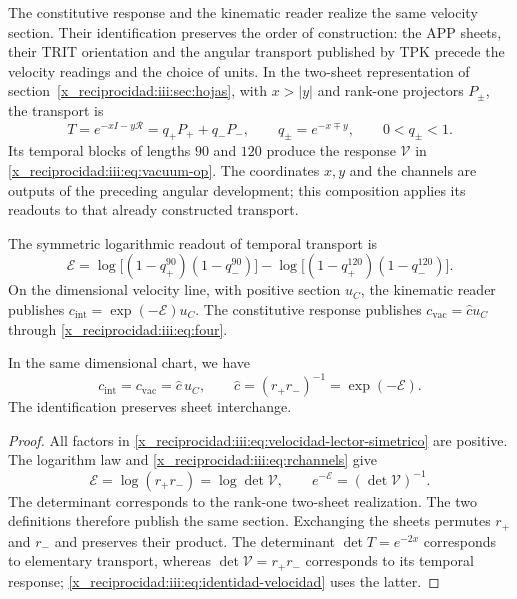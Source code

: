 The constitutive response and the kinematic reader realize the same
velocity section. Their identification preserves the order of construction:
the APP sheets, their TRIT orientation and the angular transport published
by TPK precede the velocity readings and the choice of units.
In the two-sheet representation of
section~\ref{x_reciprocidad:iii:sec:hojas}, with $x>|y|$ and rank-one projectors
$P_\pm$, the transport is
\[
 T=e^{-xI-y\mathcal R}=q_+P_++q_-P_-,
 \qquad q_\pm=e^{-x\mp y},\qquad 0<q_\pm<1.
\]
Its temporal blocks of lengths $90$ and $120$ produce the response
$\mathcal V$ in \eqref{x_reciprocidad:iii:eq:vacuum-op}. The coordinates $x,y$ and the
channels are outputs of the preceding angular development; this composition
applies its readouts to that already constructed transport.

The symmetric logarithmic readout of temporal transport is
\begin{equation}
 \mathcal E=
 \log\!\bigl[(1-q_+^{90})(1-q_-^{90})\bigr]
 -\log\!\bigl[(1-q_+^{120})(1-q_-^{120})\bigr].
 \label{x_reciprocidad:iii:eq:velocidad-lector-simetrico}
\end{equation}
On the dimensional velocity line, with positive section $u_C$, the
kinematic reader publishes $c_{\mathrm{int}}=\exp(-\mathcal E)u_C$.
The constitutive response publishes
$c_{\mathrm{vac}}=\widehat c u_C$ through \eqref{x_reciprocidad:iii:eq:four}.

\begin{proposition}
\label{x_reciprocidad:iii:prop:identidad-velocidad}
In the same dimensional chart, we have
\begin{equation}
 c_{\mathrm{int}}=c_{\mathrm{vac}}=\widehat c\,u_C,
 \qquad \widehat c=(r_+r_-)^{-1}=\exp(-\mathcal E).
 \label{x_reciprocidad:iii:eq:identidad-velocidad}
\end{equation}
The identification preserves sheet interchange.
\end{proposition}
\begin{proof}
All factors in \eqref{x_reciprocidad:iii:eq:velocidad-lector-simetrico} are
positive. The logarithm law and \eqref{x_reciprocidad:iii:eq:rchannels} give
\[
 \mathcal E=\log(r_+r_-)=\log\det\mathcal V,
 \qquad e^{-\mathcal E}=(\det\mathcal V)^{-1}.
\]
The determinant corresponds to the rank-one two-sheet realization.
The two definitions therefore publish the same section. Exchanging
the sheets permutes $r_+$ and $r_-$ and preserves their product. The determinant
$\det T=e^{-2x}$ corresponds to elementary transport, whereas
$\det\mathcal V=r_+r_-$ corresponds to its temporal response;
\eqref{x_reciprocidad:iii:eq:identidad-velocidad} uses the latter.
\end{proof}

